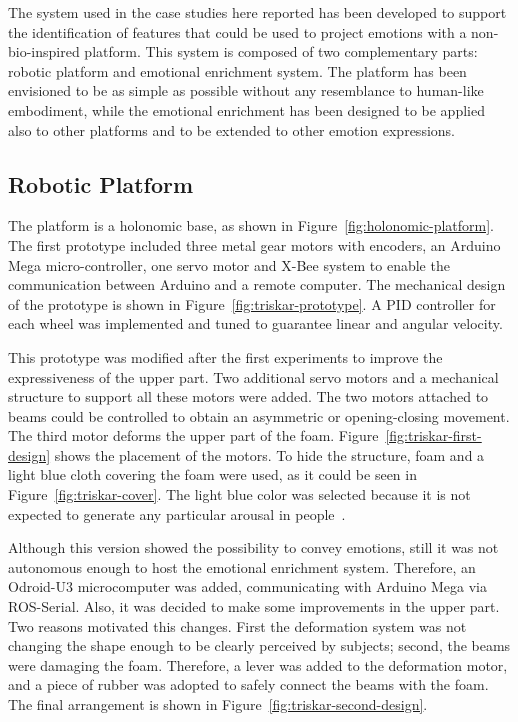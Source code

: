 The system used in the case studies here reported has been developed to support the identification of features that could be used to project emotions with a non-bio-inspired platform. This system is composed of two complementary parts: robotic platform and emotional enrichment system. The platform has been envisioned to be as simple as possible without any resemblance to human-like embodiment, while the emotional enrichment has been designed to be applied also to other platforms and to be extended to other emotion expressions.
 
\subsection{Robotic Platform}
The platform is a holonomic base, as shown in Figure~\ref{fig:holonomic-platform}. The first prototype included three metal gear motors with encoders, an Arduino Mega micro-controller, one servo motor and X-Bee system to enable the communication between Arduino and a remote computer. The mechanical design of the prototype is shown in Figure~\ref{fig:triskar-prototype}. A PID controller for each wheel was implemented and tuned to guarantee linear and angular velocity.

This prototype was modified after the first experiments to improve the expressiveness of the upper part. Two additional servo motors and a mechanical structure to support all these motors were added. The two motors attached to beams could be controlled to obtain an asymmetric or opening-closing movement. 
The third motor deforms the upper part of the foam. Figure~\ref{fig:triskar-first-design} shows the placement of the motors. To hide the structure, foam and a light blue cloth covering the foam were used, as it could be seen in Figure~\ref{fig:triskar-cover}. The light blue color was selected because it is not expected to generate any particular arousal in people~\cite{Promarker}. 

Although this version showed the possibility to convey emotions, still it was not autonomous enough to host the emotional enrichment system. Therefore, an Odroid-U3 microcomputer was added, communicating with Arduino Mega via ROS-Serial.
Also, it was decided to make some improvements in the upper part. Two reasons motivated this changes. First the deformation system was not changing the shape enough to be clearly perceived by subjects; second, the beams were damaging the foam. Therefore, a lever  was added to the deformation motor, and a piece of rubber was adopted to safely connect the beams with the foam. The final arrangement is shown in Figure~\ref{fig:triskar-second-design}.
 
